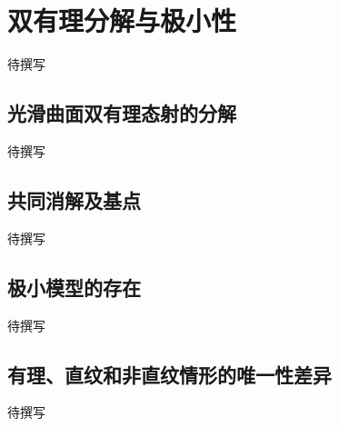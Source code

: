 
% 
% 

\section{双有理分解与极小性}
\label{g5:sec:2603}

待撰写

\subsection{光滑曲面双有理态射的分解}
\label{g5:subsec:2603:01}
待撰写

\subsection{共同消解及基点}
\label{g5:subsec:2603:02}
待撰写

\subsection{极小模型的存在}
\label{g5:subsec:2603:03}
待撰写

\subsection{有理、直纹和非直纹情形的唯一性差异}
\label{g5:subsec:2603:04}
待撰写

